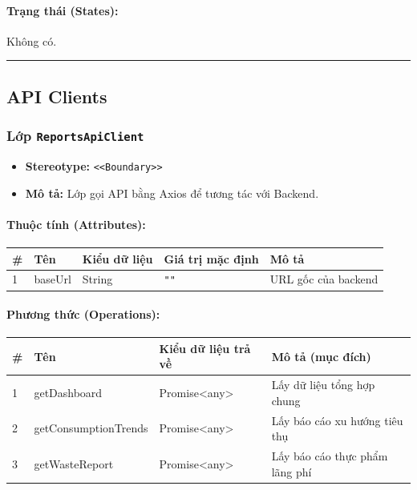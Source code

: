 \documentclass[12pt,a4paper]{article}
\begin{document}
\paragraph{Trạng thái (States):}
Không có.

\vskip 0.5cm
\noindent\rule{\textwidth}{0.5pt}
\vskip 0.5cm

\subsection{API Clients}

\subsubsection{Lớp \texttt{ReportsApiClient}}
\begin{itemize}[leftmargin=*]
    \item \textbf{Stereotype:} \texttt{\textless{}\textless{}Boundary\textgreater{}\textgreater{}}
    \item \textbf{Mô tả:} Lớp gọi API bằng Axios để tương tác với Backend.
\end{itemize}

\paragraph{Thuộc tính (Attributes):}
\begin{longtable}{|p{0.6cm}|p{2.8cm}|p{2.2cm}|p{1.8cm}|p{5.8cm}|}
\hline
\textbf{\#} & \textbf{Tên} & \textbf{Kiểu dữ liệu} & \textbf{Giá trị mặc định} & \textbf{Mô tả} \\ \hline
\endhead
1 & baseUrl & String & \texttt{""} & URL gốc của backend \\ \hline
\end{longtable}

\paragraph{Phương thức (Operations):}
\begin{longtable}{|p{0.6cm}|p{3.8cm}|p{2.6cm}|p{6.5cm}|}
\hline
\textbf{\#} & \textbf{Tên} & \textbf{Kiểu dữ liệu trả về} & \textbf{Mô tả (mục đích)} \\ \hline
\endhead
1 & getDashboard & Promise\textless{}any\textgreater{} & Lấy dữ liệu tổng hợp chung \\ \hline
2 & getConsumptionTrends & Promise\textless{}any\textgreater{} & Lấy báo cáo xu hướng tiêu thụ \\ \hline
3 & getWasteReport & Promise\textless{}any\textgreater{} & Lấy báo cáo thực phẩm lãng phí \\ \hline
\end{longtable}
\end{document}
